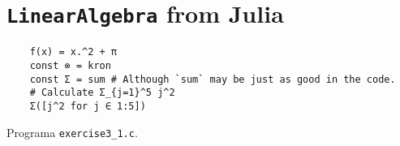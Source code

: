 \chapter{\texttt{LinearAlgebra} from Julia}

\begin{listing}[H]
  \footnotesize
  \begin{verbatim}
    f(x) = x.^2 + π
    const ⊗ = kron
    const Σ = sum # Although `sum` may be just as good in the code.
    # Calculate Σ_{j=1}^5 j^2
    Σ([j^2 for j ∈ 1:5])
    \end{verbatim}
  \caption{Programa \texttt{exercise3\_1.c}.}
  \label{lst:3.1}
\end{listing}